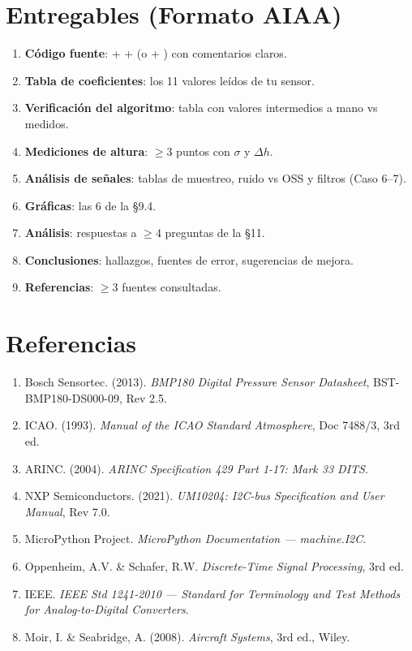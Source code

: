 \documentclass[11pt]{article}
\begin{document}
\section{Entregables (Formato AIAA)}
\begin{enumerate}
  \item \textbf{Código fuente}:  +  + 
        (o  + ) con comentarios claros.
  \item \textbf{Tabla de coeficientes}: los 11 valores leídos de tu sensor.
  \item \textbf{Verificación del algoritmo}: tabla con valores intermedios a mano vs medidos.
  \item \textbf{Mediciones de altura}: $\ge 3$ puntos con $\sigma$ y $\Delta h$.
  \item \textbf{Análisis de señales}: tablas de muestreo, ruido vs OSS y filtros (Caso 6--7).
  \item \textbf{Gráficas}: las 6 de la \S9.4.
  \item \textbf{Análisis}: respuestas a $\ge 4$ preguntas de la \S11.
  \item \textbf{Conclusiones}: hallazgos, fuentes de error, sugerencias de mejora.
  \item \textbf{Referencias}: $\ge 3$ fuentes consultadas.
\end{enumerate}

\section{Referencias}
\begin{enumerate}
  \item Bosch Sensortec. (2013). \emph{BMP180 Digital Pressure Sensor Datasheet},
        BST-BMP180-DS000-09, Rev 2.5.
  \item ICAO. (1993). \emph{Manual of the ICAO Standard Atmosphere}, Doc 7488/3, 3rd ed.
  \item ARINC. (2004). \emph{ARINC Specification 429 Part 1-17: Mark 33 DITS}.
  \item NXP Semiconductors. (2021). \emph{UM10204: I2C-bus Specification and User Manual},
        Rev 7.0.
  \item MicroPython Project. \emph{MicroPython Documentation --- machine.I2C}.
  \item Oppenheim, A.V. \& Schafer, R.W. \emph{Discrete-Time Signal Processing}, 3rd ed.
  \item IEEE. \emph{IEEE Std 1241-2010 --- Standard for Terminology and Test Methods for
        Analog-to-Digital Converters}.
  \item Moir, I. \& Seabridge, A. (2008). \emph{Aircraft Systems}, 3rd ed., Wiley.
\end{enumerate}
\end{document}
